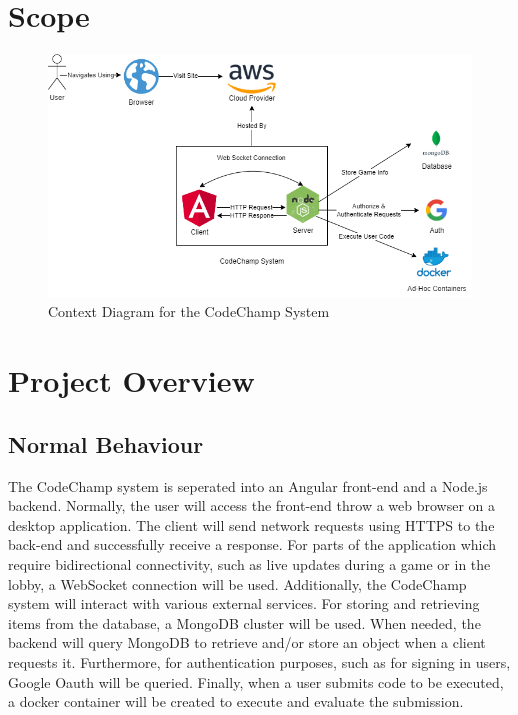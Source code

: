 \documentclass[12pt, titlepage]{article}
\begin{document}
\section{Scope}


\begin{figure}[H]
\centering
\includegraphics[scale=0.65]{Design/SystDesign/SystemBoundary.png}
\caption{Context Diagram for the CodeChamp System}
\end{figure}

\section{Project Overview}

\subsection{Normal Behaviour}
The CodeChamp system is seperated into an Angular front-end and a Node.js backend. Normally, the user will access the front-end throw a web browser on a desktop application. The client will send network requests using HTTPS to the back-end and successfully receive a response. For parts of the application which require bidirectional connectivity, such as live updates during a game or in the lobby, a WebSocket connection will be used. Additionally, the CodeChamp system will interact with various external services. For storing and retrieving items from the database, a MongoDB cluster will be used. When needed, the backend will query MongoDB to retrieve and/or store an object when a client requests it. Furthermore, for authentication purposes, such as for signing in users, Google Oauth will be queried. Finally, when a user submits code to be executed, a docker container will be created to execute and evaluate the submission.
\end{document}

